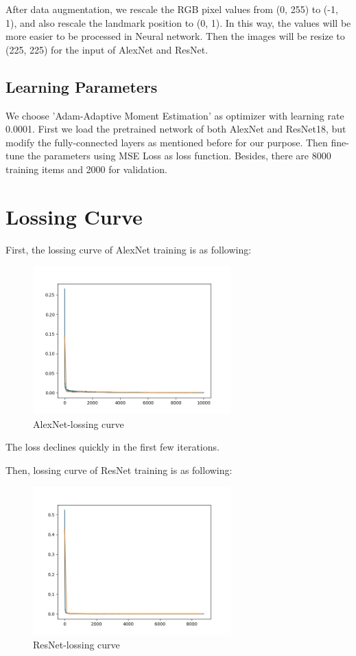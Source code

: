 \documentclass{article}
\begin{document}
After data augmentation, we rescale the RGB pixel values from (0, 255) to (-1, 1), and also rescale the landmark position to (0, 1). In this way, the values will be more easier to be processed in Neural network. Then the images will be resize to (225, 225) for the input of AlexNet and ResNet.

\subsection{Learning Parameters}
 We  choose 'Adam-Adaptive Moment Estimation' as optimizer with learning rate 0.0001. First we load the pretrained network of both AlexNet and ResNet18, but modify the fully-connected layers as mentioned before for our purpose. Then fine-tune the parameters using MSE Loss as loss function. Besides, there are 8000 training items and 2000 for validation.

 
 


	
\section{Lossing Curve }

First, the lossing curve of AlexNet training is as following:

\begin{figure}[!h]
	\centering
	\includegraphics[width=3in]{alexloss.jpg}
	\caption{AlexNet-lossing curve}
\end{figure}

The loss declines quickly in the first few iterations. 

Then, lossing curve of ResNet training is as following:

\begin{figure}[!h]
	\centering
	\includegraphics[width=3in]{resloss.jpg}
	\caption{ResNet-lossing curve}
\end{figure}
\end{document}
